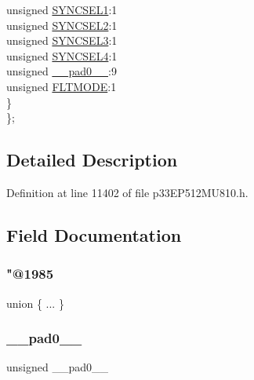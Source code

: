 \begin{DoxyCompactItemize}
\begin{tabbing}
\>\>unsigned \hyperlink{structtag_o_c5_c_o_n2_b_i_t_s_a50e73f95ab1c258ddc64f69c0991deaf}{SYNCSEL1}:1\\
\>\>unsigned \hyperlink{structtag_o_c5_c_o_n2_b_i_t_s_a304907a5d2c4cbf1114a54642a85951e}{SYNCSEL2}:1\\
\>\>unsigned \hyperlink{structtag_o_c5_c_o_n2_b_i_t_s_a6bbd1bd2ead6c9fa713969c6eb0f0c75}{SYNCSEL3}:1\\
\>\>unsigned \hyperlink{structtag_o_c5_c_o_n2_b_i_t_s_a0cd5bbe196c7974953909d27a6307bb7}{SYNCSEL4}:1\\
\>\>unsigned \hyperlink{structtag_o_c5_c_o_n2_b_i_t_s_adf71f3d8410c1f1dbbc96680a92c49af}{\_\_pad0\_\_}:9\\
\>\>unsigned \hyperlink{structtag_o_c5_c_o_n2_b_i_t_s_ad53c2a5303780172219bfd5e0100c782}{FLTMODE}:1\\
\>\} \\
\}; \\

\end{tabbing}\end{DoxyCompactItemize}


\subsection{Detailed Description}


Definition at line 11402 of file p33\+E\+P512\+M\+U810.\+h.



\subsection{Field Documentation}
\mbox{\label{structtag_o_c5_c_o_n2_b_i_t_s_a9ed23ec1c3cf98bd4700dbff35e37423}} 
\subsubsection{\texorpdfstring{"@1985}{@1985}}
{\footnotesize\ttfamily union \{ ... \} }

\mbox{\label{structtag_o_c5_c_o_n2_b_i_t_s_adf71f3d8410c1f1dbbc96680a92c49af}} 
\subsubsection{\texorpdfstring{\+\_\+\+\_\+pad0\+\_\+\+\_\+}{\_\_pad0\_\_}}
{\footnotesize\ttfamily unsigned \+\_\+\+\_\+pad0\+\_\+\+\_\+}



